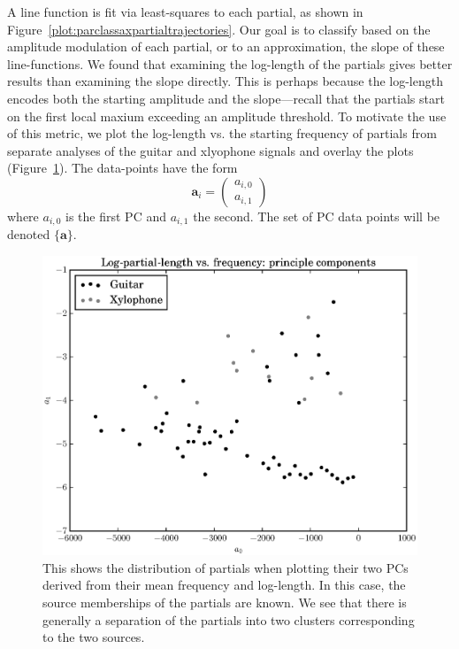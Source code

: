 A line function is fit via least-squares to each partial, as shown in
Figure~\ref{plot:parclassaxpartialtrajectories}. Our goal is to classify based
on the amplitude modulation of each partial, or to an approximation, the slope of these line-functions. We found that examining the log-length of the
partials gives better results than examining the slope directly. This is perhaps
because the log-length encodes both the starting amplitude and the slope---recall
that the partials start on the first local maxium exceeding an amplitude
threshold. To motivate the use of this metric, we plot the log-length vs. the
starting frequency of
partials from separate analyses of the guitar and xlyophone signals and overlay
the plots (Figure~\ref{plot:partialclassificationacgtrxyloseptruememberships}).
The data-points have the form
\[
    \boldsymbol{a}_i = \begin{pmatrix}
        a_{i,0} \\
        a_{i,1}
    \end{pmatrix}
\]
where $a_{i,0}$ is the first PC and $a_{i,1}$ the second. The set of PC data
points will be denoted $\{\boldsymbol{a}\}$.
\begin{figure}[!t]
    \centering
    \includegraphics[width=\figwidthscale\textwidth]{plots/partial_classification_acgtr_xylo_sep_true_memberships.eps}
    \caption{This shows the distribution of partials when plotting their two PCs
        derived from their mean frequency and log-length. In this case, the
        source memberships of the partials are known. We see that there is
        generally a separation of the partials into two clusters corresponding
        to the two sources.
        \label{plot:partialclassificationacgtrxyloseptruememberships}}
\end{figure}
